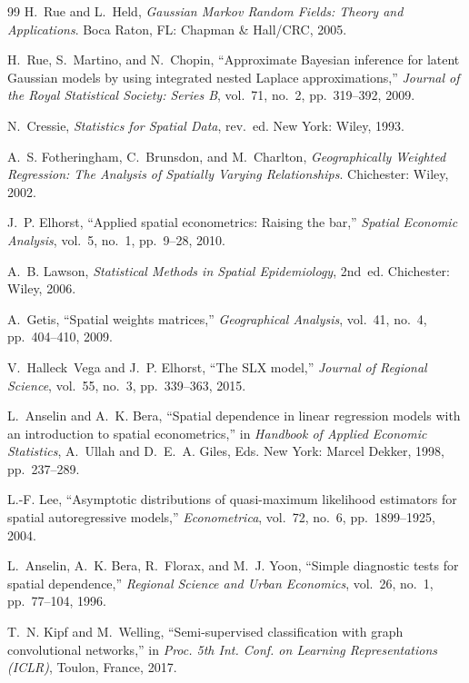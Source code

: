 \documentclass[conference]{IEEEtran}
\theoremstyle{definition}
\begin{document}
\begin{thebibliography}{99}
H.~Rue and L.~Held, \emph{Gaussian Markov Random Fields: Theory and Applications}. Boca Raton, FL: Chapman \& Hall/CRC, 2005.

H.~Rue, S.~Martino, and N.~Chopin, ``Approximate Bayesian inference for latent Gaussian models by using integrated nested Laplace approximations,'' \emph{Journal of the Royal Statistical Society: Series B}, vol.~71, no.~2, pp.~319--392, 2009.

N.~Cressie, \emph{Statistics for Spatial Data}, rev.~ed. New York: Wiley, 1993.

A.~S. Fotheringham, C.~Brunsdon, and M.~Charlton, \emph{Geographically Weighted Regression: The Analysis of Spatially Varying Relationships}. Chichester: Wiley, 2002.

J.~P. Elhorst, ``Applied spatial econometrics: Raising the bar,'' \emph{Spatial Economic Analysis}, vol.~5, no.~1, pp.~9--28, 2010.

A.~B. Lawson, \emph{Statistical Methods in Spatial Epidemiology}, 2nd~ed. Chichester: Wiley, 2006.

A.~Getis, ``Spatial weights matrices,'' \emph{Geographical Analysis}, vol.~41, no.~4, pp.~404--410, 2009.

V.~Halleck~Vega and J.~P. Elhorst, ``The SLX model,'' \emph{Journal of Regional Science}, vol.~55, no.~3, pp.~339--363, 2015.

L.~Anselin and A.~K. Bera, ``Spatial dependence in linear regression models with an introduction to spatial econometrics,'' in \emph{Handbook of Applied Economic Statistics}, A.~Ullah and D.~E.~A. Giles, Eds. New York: Marcel Dekker, 1998, pp.~237--289.

L.-F. Lee, ``Asymptotic distributions of quasi-maximum likelihood estimators for spatial autoregressive models,'' \emph{Econometrica}, vol.~72, no.~6, pp.~1899--1925, 2004.

L.~Anselin, A.~K. Bera, R.~Florax, and M.~J. Yoon, ``Simple diagnostic tests for spatial dependence,'' \emph{Regional Science and Urban Economics}, vol.~26, no.~1, pp.~77--104, 1996.

T.~N. Kipf and M.~Welling, ``Semi-supervised classification with graph convolutional networks,'' in \emph{Proc. 5th Int. Conf. on Learning Representations (ICLR)}, Toulon, France, 2017.


\end{thebibliography}
\end{document}
